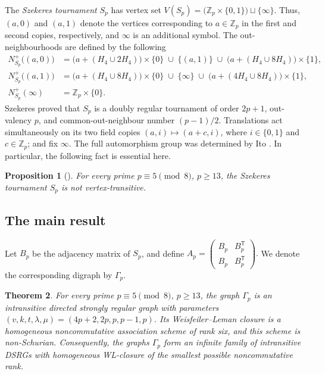 \documentclass[11pt]{article}
\newtheorem{theorem}{Theorem}[section]
\newtheorem{proposition}[theorem]{Proposition}
\theoremstyle{definition}
\theoremstyle{remark}
\begin{document}
The \emph{Szekeres tournament} $S_p$ has vertex set
$V(S_p)=\bigl(\mathbb Z_p\times\{0,1\}\bigr)\sqcup\{\infty\}$. 
Thus, \((a,0)\) and \((a,1)\) denote the vertices corresponding to
\(a\in\mathbb Z_p\) in the first and second copies, respectively, and 
$\infty$ is an additional symbol.
The out-neighbourhoods are defined by the following
\begin{align*}
N^+_{S_p}\bigl((a,0)\bigr) &= \bigl(a+(H_4\cup2H_4)\bigr)\times\{0\}
 \;\cup\;\{(a,1)\} \;\cup\; \bigl(a+(H_4\cup8H_4)\bigr)\times\{1\}, \\
N^+_{S_p}\bigl((a,1)\bigr) &= \bigl(a+(H_4\cup8H_4)\bigr)\times\{0\}
 \;\cup\;\{\infty\} \;\cup\; \bigl(a+(4H_4\cup8H_4)\bigr)\times\{1\}, \\
N^+_{S_p}(\infty)  &=\mathbb Z_p\times\{0\}.
\end{align*}
Szekeres \cite{sz} proved that $S_p$ is a doubly regular tournament of order $2p+1$,
out-valency $p$, and common-out-neighbour number $(p-1)/2$.  
Translations act simultaneously on its two field copies 
$(a,i)\longmapsto(a+c,i)$, where  $i\in\{0,1\}$ and $c\in\mathbb Z_p$;
and fix $\infty$. 
The full automorphism group was determined by Ito \cite{ito}.  
In particular, the following fact is essential here.

\begin{proposition}[\cite{ito}]
\label{prop:Szekeres-intransitive}
For every prime $p\equiv5\pmod8$, $p\geq13$, the Szekeres tournament $S_p$
is not vertex-transitive.
\end{proposition}

\subsection{The main result}

Let $B_p$ be the adjacency matrix of $S_p$, and define
$A_p=\left(\begin{smallmatrix}
B_p & B_p^{\mathsf T}\\
B_p & B_p^{\mathsf T}
\end{smallmatrix}\right).$
We denote the corresponding digraph by $\Gamma_p$.

\begin{theorem}
\label{thm:main-infinite-family}
For every prime $p\equiv5\pmod8$, $p\geq13$, the graph $\Gamma_p$ is an
intransitive directed strongly regular graph with parameters
$(v,k,t,\lambda,\mu)=(4p+2,2p,p,p-1,p)$.
Its Weisfeiler--Leman closure is a homogeneous noncommutative association
scheme of rank six, and this scheme is non-Schurian.  Consequently, the
graphs $\Gamma_p$ form an infinite family of intransitive DSRGs with
homogeneous WL-closure of the smallest possible noncommutative rank.
\end{theorem}
\end{document}
